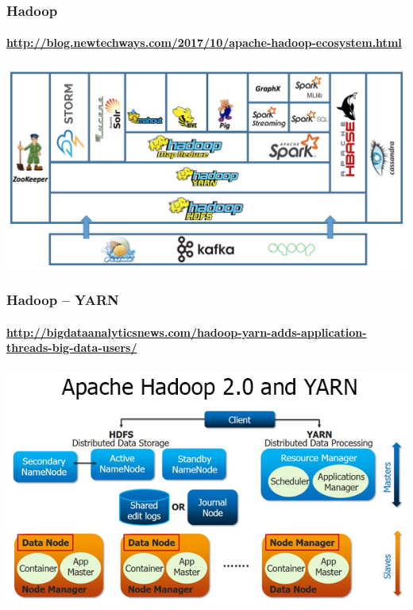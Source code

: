 \documentclass[14pt]{beamer}
\begin{document}
\begin{frame}
  \frametitle{Hadoop}
  \framesubtitle{\url{http://blog.newtechways.com/2017/10/apache-hadoop-ecosystem.html}}
  \includegraphics[width=\textwidth]{img/hadoop}
\end{frame}

\begin{frame}
  \frametitle{Hadoop -- YARN}
 \framesubtitle{\url{http://bigdataanalyticsnews.com/hadoop-yarn-adds-application-threads-big-data-users/}}
  \includegraphics[width=\textwidth]{img/hadoop-yarn}
\end{frame}
\end{document}
